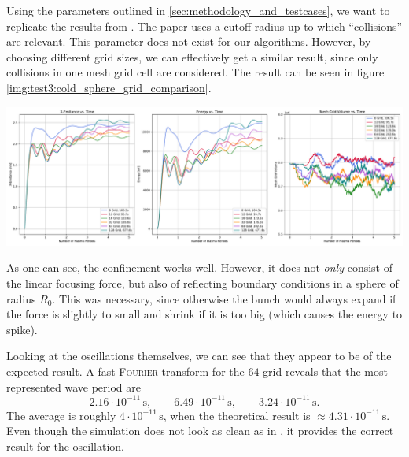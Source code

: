 
Using the parameters outlined in \ref{sec:methodology_and_testcases}, we want to replicate the results from \cite[595]{Mitchell2015}. The paper uses a cutoff radius up to which ``collisions'' are relevant. This parameter does not exist for our algorithms. However, by choosing different grid sizes, we can effectively get a similar result, since only collisions in one mesh grid cell are considered. The result can be seen in figure \ref{img:test3:cold_sphere_grid_comparison}. \\
\begin{minipage}[h]{\linewidth}
    \vspace{5pt}
    \centering
    \includegraphics[width=\linewidth]{ressources/test3/cold_sphere_grid_comparison.pdf}
    \label{img:test3:cold_sphere_grid_comparison}
    \vspace{5pt}
\end{minipage}
As one can see, the confinement works well. However, it does not \textit{only} consist of the linear focusing force, but also of reflecting boundary conditions in a sphere of radius $R_0$. This was necessary, since otherwise the bunch would always expand if the force is slightly to small and shrink if it is too big (which causes the energy to spike).

Looking at the oscillations themselves, we can see that they appear to be of the expected result. A fast \textsc{Fourier} transform for the $64$-grid reveals that the most represented wave period are 
$$
2.16\cdot 10^{-11}\,\si{\second},
\qquad 6.49\cdot 10^{-11}\,\si{\second},
\qquad 3.24\cdot 10^{-11}\,\si{\second} .
$$
The average is roughly $4\cdot 10^{-11}\,\si{\second}$, when the theoretical result is $\approx 4.31\cdot 10^{-11}\,\si{\second}$. Even though the simulation does not look as clean as in \cite[595]{Mitchell2015}, it provides the correct result for the oscillation.


